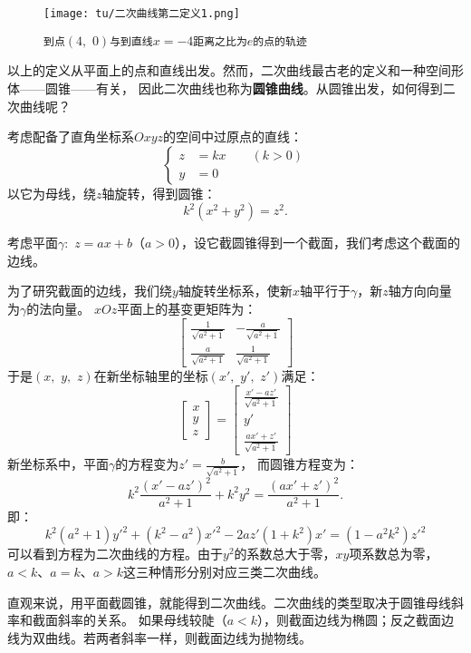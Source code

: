 \documentclass[12pt,UTF8]{ctexbook}
\theoremstyle{definition}
\theoremstyle{plain}
\begin{document}
\begin{figure}[h] 
    \centering
    \texttt{[image: tu/二次曲线第二定义1.png]}
    \caption*{\texttt{到点}$(4,\,\,0)$\texttt{与到直线}$x=-4$\texttt{距离之比为}$e$\texttt{的点的轨迹}}
\end{figure}
以上的定义从平面上的点和直线出发。然而，二次曲线最古老的定义和一种空间形体——圆锥——有关，
因此二次曲线也称为\textbf{圆锥曲线}。从圆锥出发，如何得到二次曲线呢？

考虑配备了直角坐标系$Oxyz$的空间中过原点的直线：
$$ 
\left\{
    \begin{array}{cl}
        z &= kx \qquad (k > 0) \\
        y &= 0
    \end{array}
\right.
$$
以它为母线，绕$z$轴旋转，得到圆锥：
$$ k^2(x^2 + y^2) = z^2. $$

考虑平面$\gamma: \,\,z = ax + b$（$a > 0$），设它截圆锥得到一个截面，我们考虑这个截面的边线。

为了研究截面的边线，我们绕$y$轴旋转坐标系，使新$x$轴平行于$\gamma$，新$z$轴方向向量为$\gamma$的法向量。
$xOz$平面上的基变更矩阵为：
$$
\begin{bmatrix}
    \frac{1}{\sqrt{a^2+1}} & -\frac{a}{\sqrt{a^2+1}} \\
    \frac{a}{\sqrt{a^2+1}} & \frac{1}{\sqrt{a^2+1}}
\end{bmatrix}
$$
于是$(x,\,\,y,\,\,z)$在新坐标轴里的坐标$(x',\,\,y',\,\,z')$满足：
$$
\begin{bmatrix}
    x \\ y \\ z
\end{bmatrix}
= 
\begin{bmatrix}
    \frac{x' - az'}{\sqrt{a^2+1}} \\ y' \\ \frac{ax' + z'}{\sqrt{a^2+1}}
\end{bmatrix}
$$
新坐标系中，平面$\gamma$的方程变为$z'=\frac{b}{\sqrt{a^2+1}}$，
而圆锥方程变为：
$$ k^2\frac{(x' - az')^2}{a^2+1} + k^2y^2 = \frac{(ax' + z')^2}{a^2+1} . $$
即：
$$ k^2(a^2+1)y'^2 + (k^2 - a^2)x'^2 - 2az'(1 + k^2)x' = (1 - a^2k^2)z'^2 $$
可以看到方程为二次曲线的方程。由于$y^2$的系数总大于零，$xy$项系数总为零，
$a<k$、$a=k$、$a>k$这三种情形分别对应三类二次曲线。


直观来说，用平面截圆锥，就能得到二次曲线。二次曲线的类型取决于圆锥母线斜率和截面斜率的关系。
如果母线较陡（$a<k$），则截面边线为椭圆；反之截面边线为双曲线。若两者斜率一样，则截面边线为抛物线。
\end{document}
